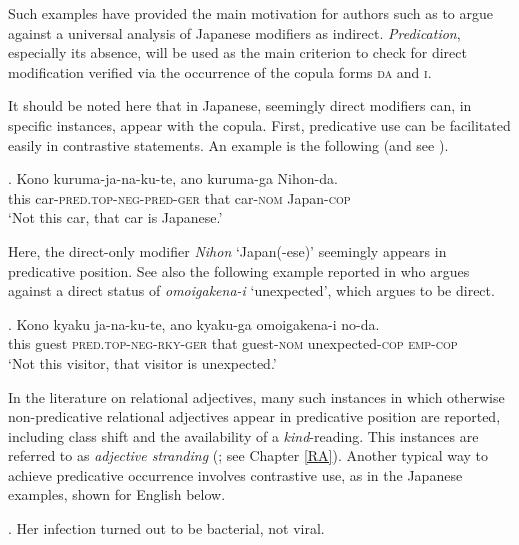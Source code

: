 \documentclass [output=book,colorlinks,citecolor=brown]{langscibook}
\begin{document}
Such examples have provided the main motivation for authors such as \cite{yamakido:2005:nature} to argue against a universal analysis of Japanese modifiers as indirect. \textit{Predication}, especially its absence, will be used as the main criterion to check for direct modification verified via the occurrence of the copula forms \textsc{da} and \textsc{i}. %

It should be noted here that in Japanese, seemingly direct modifiers can, in specific instances, appear with the copula. First, predicative use can be facilitated easily in contrastive statements. An example is the following (and see \citealt{hoshi:2002:kaynean, shimada:2018:relational}).

\exg. Kono kuruma-ja-na-ku-te, ano kuruma-ga Nihon-da.\\
this car-\textsc{pred.top-neg-pred-ger} that car-\textsc{nom} Japan-\textsc{cop}\\
`Not this car, that car is Japanese.’ \label{kurumajanakute}

Here, the direct-only modifier \textit{Nihon} `Japan(-ese)’ seemingly appears in predicative position. See also the following example reported in \citet{hoshi:2002:kaynean} who argues against a direct status of \textit{omoigakena-i} `unexpected’, which \citet{yamakido:2005:nature} argues to be direct.

\exg. Kono kyaku ja-na-ku-te, ano kyaku-ga omoigakena-i no-da.\\
this guest \textsc{pred.top-neg-rky-ger} that guest-\textsc{nom} unexpected-\textsc{cop} \textsc{emp-cop}\\
`Not this visitor, that visitor is unexpected.' \\ \null \hfill \citep[11]{hoshi:2002:kaynean}

In the literature on relational adjectives, many such instances in which otherwise non-predicative relational adjectives appear in predicative position are reported, including class shift and the availability of a \textit{kind}-reading. This instances are referred to as \textit{adjective stranding} (\citealt{levi:1978:syntax, mcnally:2004:relational, nagano:2018:conversion}; see Chapter \ref{RA}). Another typical way to achieve predicative occurrence involves contrastive use, as in the Japanese examples, shown for English below. %

\ex. Her infection turned out to be bacterial, not viral. \null \hfill \citep[254]{levi:1978:syntax} \label{viral stranding}
\end{document}
